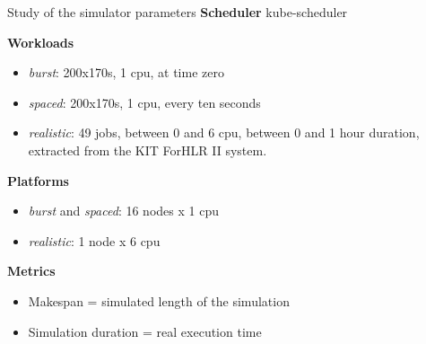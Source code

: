 \documentclass[12pt, aspectratio=43]{beamer}
\begin{document}
\begin{frame}{Study of the simulator parameters}
	\textbf{Scheduler} kube-scheduler

	\textbf{Workloads}
	\begin{itemize}
		\item \textit{burst}: 200x170s, 1 cpu, at time zero
		\item \textit{spaced}: 200x170s, 1 cpu, every ten seconds
		\item \textit{realistic}: 49 jobs, between 0 and 6 cpu, between 0 and 1 hour duration, extracted from the KIT ForHLR II system.
	\end{itemize}

	\textbf{Platforms}
	\begin{itemize}
		\item \textit{burst} and \textit{spaced}: 16 nodes x 1 cpu
		\item \textit{realistic}: 1 node x 6 cpu
	\end{itemize}

	\textbf{Metrics}
	\begin{itemize}
		\item Makespan = simulated length of the simulation
		\item Simulation duration = real execution time
	\end{itemize}
\end{frame}
\end{document}
